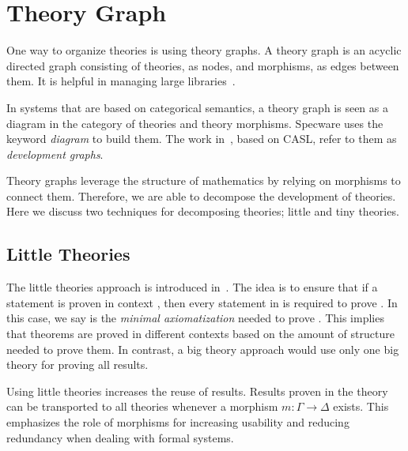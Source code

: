 \section{Theory Graph}\label{sec:background:theorygraph}
One way to organize theories is using theory graphs. A theory graph is an acyclic directed graph consisting of theories, as nodes, and morphisms, as edges between them. It is helpful in managing large libraries~\cite{kohlhase2010towards}.

In systems that are based on categorical semantics, a theory graph is seen as a diagram in the category of theories and theory morphisms. Specware uses the keyword \emph{diagram} to build them. The work in~\cite{developmentGraph2000}, based on CASL, refer to them as \emph{development graphs}. 

Theory graphs leverage the structure of mathematics by relying on morphisms to connect them. Therefore, we are able to decompose the development of theories. Here we discuss two techniques for decomposing theories; little and tiny theories.  

\subsection{Little Theories}
The little theories approach is introduced in~\cite{LittleTheories}. The idea is to ensure that if a statement  is proven in context \lstmath{$\Gamma$}, then every statement in \lstmath{$\Gamma$} is required to prove . In this case, we say \lstmath{$\Gamma$} is the \emph{minimal axiomatization} needed to prove . This implies that theorems are proved in different contexts based on the amount of structure needed to prove them. In contrast, a big theory approach would use only one big theory for proving all results. 

Using little theories increases the reuse of results. Results proven in the theory \lstmath{$\Gamma$} can be transported to all theories \lstmath{$\Delta$} whenever a morphism $m : \Gamma \to \Delta$ exists. This emphasizes the role of morphisms for increasing usability and reducing redundancy when dealing with formal systems.  

